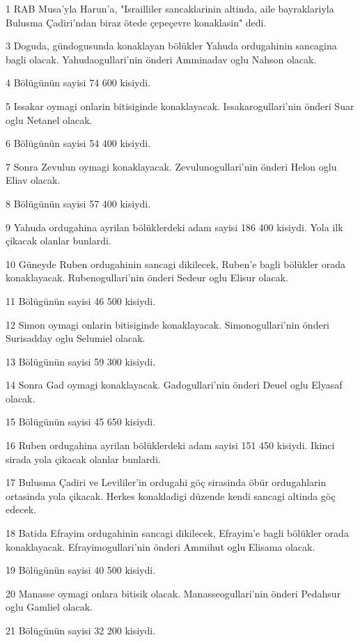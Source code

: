 \par 1 RAB Musa'yla Harun'a, "Israilliler sancaklarinin altinda, aile bayraklariyla Bulusma Çadiri'ndan biraz ötede çepeçevre konaklasin" dedi.
\par 3 Doguda, gündogusunda konaklayan bölükler Yahuda ordugahinin sancagina bagli olacak. Yahudaogullari'nin önderi Amminadav oglu Nahson olacak.
\par 4 Bölügünün sayisi 74 600 kisiydi.
\par 5 Issakar oymagi onlarin bitisiginde konaklayacak. Issakarogullari'nin önderi Suar oglu Netanel olacak.
\par 6 Bölügünün sayisi 54 400 kisiydi.
\par 7 Sonra Zevulun oymagi konaklayacak. Zevulunogullari'nin önderi Helon oglu Eliav olacak.
\par 8 Bölügünün sayisi 57 400 kisiydi.
\par 9 Yahuda ordugahina ayrilan bölüklerdeki adam sayisi 186 400 kisiydi. Yola ilk çikacak olanlar bunlardi.
\par 10 Güneyde Ruben ordugahinin sancagi dikilecek, Ruben'e bagli bölükler orada konaklayacak. Rubenogullari'nin önderi Sedeur oglu Elisur olacak.
\par 11 Bölügünün sayisi 46 500 kisiydi.
\par 12 Simon oymagi onlarin bitisiginde konaklayacak. Simonogullari'nin önderi Surisadday oglu Selumiel olacak.
\par 13 Bölügünün sayisi 59 300 kisiydi.
\par 14 Sonra Gad oymagi konaklayacak. Gadogullari'nin önderi Deuel oglu Elyasaf olacak.
\par 15 Bölügünün sayisi 45 650 kisiydi.
\par 16 Ruben ordugahina ayrilan bölüklerdeki adam sayisi 151 450 kisiydi. Ikinci sirada yola çikacak olanlar bunlardi.
\par 17 Bulusma Çadiri ve Levililer'in ordugahi göç sirasinda öbür ordugahlarin ortasinda yola çikacak. Herkes konakladigi düzende kendi sancagi altinda göç edecek.
\par 18 Batida Efrayim ordugahinin sancagi dikilecek, Efrayim'e bagli bölükler orada konaklayacak. Efrayimogullari'nin önderi Ammihut oglu Elisama olacak.
\par 19 Bölügünün sayisi 40 500 kisiydi.
\par 20 Manasse oymagi onlara bitisik olacak. Manasseogullari'nin önderi Pedahsur oglu Gamliel olacak.
\par 21 Bölügünün sayisi 32 200 kisiydi.
